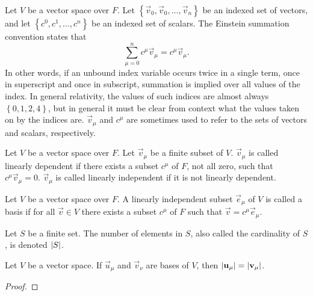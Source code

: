 \documentclass[../main.tex]{subfiles}
\begin{document}
    \begin{notation}
        Let \(V\) be a vector space over \(F\). Let \(\left\{\vec{v}_{0},\vec{v}_{0},\dots,\vec{v}_{n}\right\}\) be an indexed set of vectors, and let \(\left\{c^{0},c^{1},\dots,c^{n}\right\}\) be an indexed set of scalars. The Einstein summation convention states that
        \begin{equation*}
            \sum_{\mu=0}^{n}c^{\mu}\vec{v}_{\mu}=c^{\mu}\vec{v}_{\mu}.
        \end{equation*}
        In other words, if an unbound index variable occurs twice in a single term, once in superscript and once in subscript, summation is implied over all values of the index. In general relativity, the values of such indices are almost always \(\left\{0,1,2,4\right\}\), but in general it must be clear from context what the values taken on by the indices are. \(\vec{v}_{\mu}\) and \(c^{\mu}\) are sometimes used to refer to the sets of vectors and scalars, respectively.
    \end{notation}
    \begin{definition}
        Let \(V\) be a vector space over \(F\). Let \(\vec{v}_{\mu}\) be a finite subset of \(V\). \(\vec{v}_{\mu}\) is called linearly dependent if there exists a subset \(c^{\mu}\) of \(F\), not all zero, such that \(c^{\mu}\vec{v}_{\mu}=0\). \(\vec{v}_{\mu}\) is called linearly independent if it is not linearly dependent.
    \end{definition}
    \begin{definition}[Bases]
        Let \(V\) be a vector space over \(F\). A linearly independent subset \(\vec{e}_{\mu}\) of \(V\) is called a basis if for all \(\vec{v}\in{}V\) there exists a subset \(c^{\mu}\) of \(F\) such that \(\vec{v}=c^{\mu}\vec{e}_{\mu}\).
    \end{definition}
    \begin{notation}[Cardinality]
        Let \(S\) be a finite set. The number of elements in \(S\), also called the cardinality of \(S\), is denoted \(\lvert S\rvert\).
    \end{notation}
    \begin{theorem}
        Let \(V\) be a vector space. If \(\vec{u}_{\mu}\) and \(\vec{v}_{\nu}\) are bases of \(V\), then \(\lvert\mathbf{u}_{\mu}\rvert=\lvert\mathbf{v}_{\mu}\rvert\).
        \begin{proof}
        \end{proof}
    \end{theorem}
\end{document}
